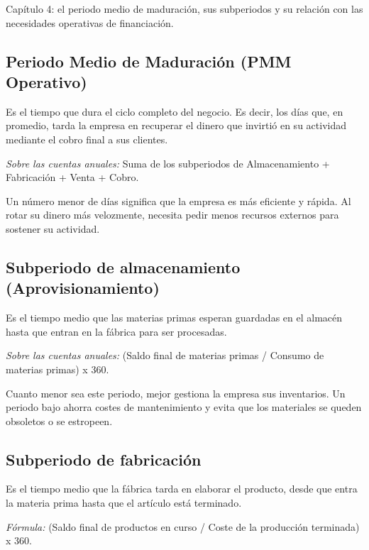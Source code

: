 \documentclass[12pt]{book} %
\begin{document}
Capítulo 4: el periodo medio de maduración, sus subperiodos y su
relación con las necesidades operativas de financiación.

\hypertarget{periodo-medio-de-maduraciuxf3n-pmm-operativo}{%
\subsection{Periodo Medio de Maduración (PMM
Operativo)}\label{periodo-medio-de-maduraciuxf3n-pmm-operativo}}

Es el tiempo que dura el ciclo completo del negocio. Es decir, los días
que, en promedio, tarda la empresa en recuperar el dinero que invirtió
en su actividad mediante el cobro final a sus clientes.

\emph{Sobre las cuentas anuales:} Suma de los subperiodos de
Almacenamiento + Fabricación + Venta + Cobro.

Un número menor de días significa que la empresa es más eficiente y
rápida. Al rotar su dinero más velozmente, necesita pedir menos recursos
externos para sostener su actividad.

\hypertarget{subperiodo-de-almacenamiento-aprovisionamiento}{%
\subsection{Subperiodo de almacenamiento
(Aprovisionamiento)}\label{subperiodo-de-almacenamiento-aprovisionamiento}}

Es el tiempo medio que las materias primas esperan guardadas en el
almacén hasta que entran en la fábrica para ser procesadas.

\emph{Sobre las cuentas anuales:} (Saldo final de materias primas /
Consumo de materias primas) x 360.

Cuanto menor sea este periodo, mejor gestiona la empresa sus
inventarios. Un periodo bajo ahorra costes de mantenimiento y evita que
los materiales se queden obsoletos o se estropeen.

\hypertarget{subperiodo-de-fabricaciuxf3n}{%
\subsection{Subperiodo de
fabricación}\label{subperiodo-de-fabricaciuxf3n}}

Es el tiempo medio que la fábrica tarda en elaborar el producto, desde
que entra la materia prima hasta que el artículo está terminado.

\emph{Fórmula:} (Saldo final de productos en curso / Coste de la
producción terminada) x 360.
\end{document}
